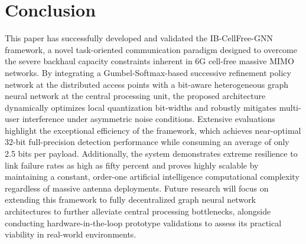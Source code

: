 \section{Conclusion}

This paper has successfully developed and validated the IB-CellFree-GNN framework, a novel task-oriented communication paradigm designed to overcome the severe backhaul capacity constraints inherent in 6G cell-free massive MIMO networks. By integrating a Gumbel-Softmax-based successive refinement policy network at the distributed access points with a bit-aware heterogeneous graph neural network at the central processing unit, the proposed architecture dynamically optimizes local quantization bit-widths and robustly mitigates multi-user interference under asymmetric noise conditions. Extensive evaluations highlight the exceptional efficiency of the framework, which achieves near-optimal 32-bit full-precision detection performance while consuming an average of only 2.5 bits per payload. Additionally, the system demonstrates extreme resilience to link failure rates as high as fifty percent and proves highly scalable by maintaining a constant, order-one artificial intelligence computational complexity regardless of massive antenna deployments. Future research will focus on extending this framework to fully decentralized graph neural network architectures to further alleviate central processing bottlenecks, alongside conducting hardware-in-the-loop prototype validations to assess its practical viability in real-world environments.